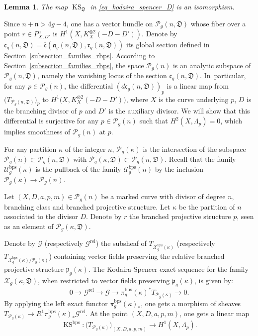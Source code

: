 \documentclass[10pt]{amsart}
\newcommand{\BPS}{\mathrm{bps}}
\newcommand{\rel}{\mathrm{rel}}
\DeclareMathOperator{\KS}{KS}
\theoremstyle{definition}
\theoremstyle{plain}
\newtheorem{lemma}[definition]{Lemma}
\begin{document}
\begin{lemma}
The map $\KS_{\mathfrak D}$ in \eqref{eq_kodaira_spencer_D} is an isomorphism.
\end{lemma}

Since $n + \mathfrak n > 4g-4$, one has a vector bundle on $\mathcal P_g(n, \mathfrak D)$ whose fiber over a point $r \in P_{X, D'}^a$ is $H^1\left(X, K_X^{\otimes 2}(-D-D')\right)$.
Denote by $\mathfrak c_g(n, \mathfrak D) = \overline {\mathfrak c}(\mathfrak a_g(n, \mathfrak D), \mathfrak r_g(n, \mathfrak D))$ its global section defined in Section~\ref{subsection_families_rbps}.
According to Section~\ref{subsection_families_rbps}, the space $\mathcal P_g(n)$ is an analytic subspace of $\mathcal P_g(n, \mathfrak D)$, namely the vanishing locus of the section $\mathfrak c_g(n, \mathfrak D)$. In~particular, for any $p \in \mathcal P_g(n)$, the differential $(d \mathfrak c_g(n, \mathfrak D))_p$ is a linear map from $\bigl(T_{\mathcal P_g(n, \mathfrak D)}\bigr)_p$ to $H^1\bigl(X, K_X^{\otimes 2}(-D-D')\bigr)$, where $X$ is the curve underlying $p$, $D$ is the branching divisor of $p$ and $D'$ is the auxiliary divisor.
We will show that this differential is surjective for any $p \in \mathcal P_g(n)$ such that $H^2(X, \Lambda_p)=0$, which implies smoothness of $\mathcal P_g(n)$ at $p$.

For any partition $\kappa$ of the integer $n$, $\mathcal P_g(\kappa)$ is the intersection of the subspace $\mathcal P_g(n) \subset \mathcal P_g(n, \mathfrak D)$ with $\mathcal P_g(\kappa, \mathfrak D) \subset \mathcal P_g(n, \mathfrak D)$.
Recall that the family $\mathcal U_g^{\BPS}(\kappa)$ is the pullback of the family $\mathcal U_g^{\BPS}(n)$ by the inclusion $\mathcal P_g(\kappa) \to \mathcal P_g(n)$.

Let $(X, D, a, p, m) \in \mathcal P_g(n)$ be a marked curve with divisor of degree $n$, branching class and branched projective structure.
Let $\kappa$ be the partition of $n$ associated to the divisor $D$.
Denote by $r$ the branched projective structure $p$, seen as an element of $\mathcal P_g(\kappa, \mathfrak D)$.

Denote by $\mathcal G$ (respectively $\mathcal G^{\rel}$) the subsheaf of $T_{\mathcal X_g^{\BPS}(\kappa)}$ (respectively $T_{\mathcal X_g^{\BPS}(\kappa)/\mathcal P_g(\kappa)}$) containing vector fields preserving the relative branched projective structure $\mathfrak p_g(\kappa)$.
The Kodaira-Spencer exact sequence for the family $\mathcal X_g(\kappa, \mathfrak D)$, when restricted to vector fields preserving $\mathfrak p_g(\kappa)$, is given by:
\begin{equation*}
0 \to \mathcal G^{\rel} \to \mathcal G \to \pi_g^{\BPS}(\kappa)^* T_{\mathcal P_g(\kappa)} \to 0.
\end{equation*}
By applying the left exact functor $\pi_g^{\BPS}(\kappa)_*$, one gets a morphism of sheaves $T_{\mathcal P_g(\kappa)} \to R^1 \pi_g^{\BPS}(\kappa)_* \mathcal G^{\rel}$.
At the point $(X, D, a, p, m)$, one gets a linear map
\begin{equation}\label{eq_kodaira_spencer_3bis}
\KS^{\BPS}: \bigl(T_{\mathcal P_g(\kappa)}\bigr)_{(X, D, a, p, m)} \to H^1(X, \Lambda_p).
\end{equation}
\end{document}
